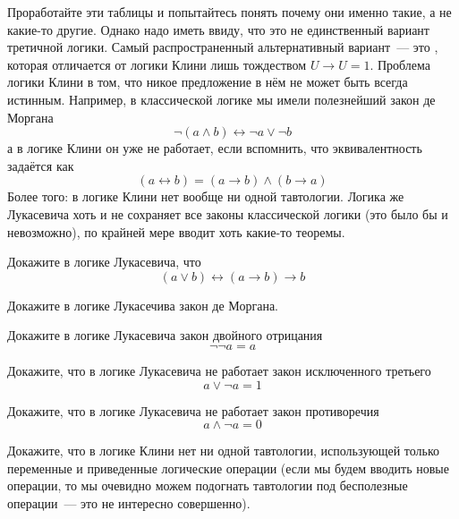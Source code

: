 Проработайте эти таблицы и попытайтесь понять почему они именно такие, а не какие-то другие. Однако надо иметь ввиду, что это не единственный вариант третичной логики. Самый распространенный альтернативный вариант~--- это , которая отличается от логики Клини лишь тождеством $U\to U = 1$. Проблема логики Клини в том, что никое предложение в нём не может быть всегда истинным. Например, в классической логике мы имели полезнейший закон де Моргана
$$\neg(a \land b) \leftrightarrow \neg a \lor \neg b$$
а в логике Клини он уже не работает, если вспомнить, что эквивалентность задаётся как
$$(a \leftrightarrow b) = (a\to b)\land (b\to a)$$
Более того: в логике Клини нет вообще ни одной тавтологии. Логика же Лукасевича хоть и не сохраняет все законы классической логики (это было бы и невозможно), по крайней мере вводит хоть какие-то теоремы.

\begin{exercise}
Докажите в логике Лукасевича, что
$$(a\lor b) \leftrightarrow (a \to b) \to b$$
\end{exercise}

\begin{exercise}
Докажите в логике Лукасечива закон де Моргана.
\end{exercise}

\begin{exercise}
Докажите в логике Лукасевича закон двойного отрицания
$$\neg\neg a = a$$
\end{exercise}

\begin{exercise}
Докажите, что в логике Лукасевича не работает закон исключенного третьего
$$a\lor \neg a = 1$$
\end{exercise}

\begin{exercise}
Докажите, что в логике Лукасевича не работает закон противоречия
$$a\land \neg a = 0$$
\end{exercise}

\begin{exercise}
Докажите, что в логике Клини нет ни одной тавтологии, использующей только переменные и приведенные логические операции (если мы будем вводить новые операции, то мы очевидно можем подогнать тавтологии под бесполезные операции~--- это не интересно совершенно).
\end{exercise}

